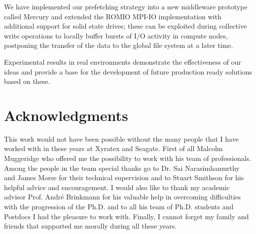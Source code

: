 \documentclass[a4paper,titlepage,oneside,11pt]{book}
\begin{document}
We have implemented our prefetching strategy into a new middleware prototype called Mercury and extended the ROMIO MPI-IO implementation with additional support for solid state
drives; these can be exploited during collective write operations to locally buffer bursts of I/O activity in compute nodes, postponing the transfer of the data to the global file
system at a later time. 

Experimental results in real environments demonstrate the effectiveness of our ideas and provide a base for the development of future production ready solutions based on these.

\chapter*{Acknowledgments}
This work would not have been possible without the many people that I have worked with in these years at Xyratex and Seagate. First of all Malcolm Muggeridge who offered me the possibility to work with his team of professionals.
Among the people in the team special thanks go to Dr. Sai Narasimhamurthy and James Morse for their technical supervision and to Stuart Smithson for his helpful advice and encouragement. I would also like to thank my academic advisor 
Prof. Andr\'e Brinkmann for his valuable help in overcoming difficulties with the progression of the Ph.D. and to all his team of Ph.D. students and Postdocs I had the pleasure to work with. Finally, I cannot forget my family and friends 
that supported me morally during all these years.

\listoffigures
\cleardoublepage

\listoftables
\cleardoublepage

\tableofcontents
\mainmatter

\end{document}
